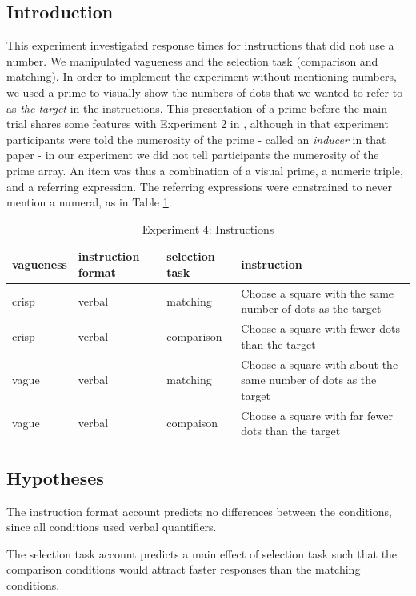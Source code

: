 \documentclass[
a4paper 
, doc
, longtable
]{apa6}
\begin{document}
\subsection{Introduction}
This experiment investigated response times for instructions that did not use a number. 
We manipulated vagueness and the selection task (comparison and matching). 
In order to implement the experiment without mentioning numbers,  we used a prime to visually show the numbers of dots that we wanted to refer to as {\em the target} in the instructions. 
This presentation of a prime before the main trial shares some features with Experiment 2 in \protect \textcite{Izard20081221}, although in that experiment participants were told the numerosity of the prime - called an \emph{inducer} in that paper - in our experiment we did not tell participants the numerosity of the prime array.
An item was thus a combination of a visual prime, a numeric triple, and a referring expression.
The referring expressions were constrained to never mention a numeral, as in Table \ref{Instructions for e4}. 


\begin{table}[htbp]
\centering
\caption{Experiment 4: Instructions}
\label{Instructions for e4}
\begin{tabular}{lllp{7cm}}
\hline
vagueness&instruction format& selection task&instruction\\
\hline
crisp & verbal&matching & Choose a square with the same number of dots as the target \\ 
crisp & verbal&comparison& Choose a square with fewer dots than the target \\
vague & verbal&matching & Choose a square with about the same number of dots as the target \\ 
vague & verbal&compaison& Choose a square with far fewer dots than the target \\ 
\hline
\end{tabular}
\end{table}

\subsection{Hypotheses}
The instruction format account predicts no differences between the conditions, since all conditions used verbal quantifiers.

The selection task account predicts a main effect of selection task such that the comparison conditions would attract faster responses than the matching conditions.
\end{document}
